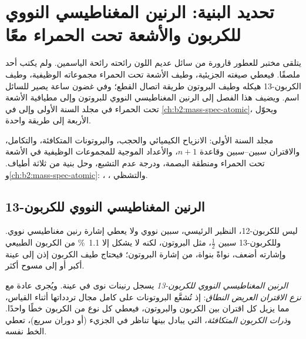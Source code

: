 \chapter{تحديد البنية: الرنين المغناطيسي النووي للكربون \texorpdfstring{\protect{}}{13C}  والأشعة تحت الحمراء معًا}\label{ch:b2:structure-determination}

يتلقى مختبر للعطور قارورة من سائل عديم اللون رائحته رائحة الياسمين. ولم يكتب أحد
ملصقًا. فيعطي  صيغته الجزيئية، وطيف الأشعة تحت الحمراء مجموعاته
الوظيفية، وطيف الكربون-13 هيكله وطيف البروتون طريقة اتصال القطع؛ وفي غضون
ساعة يصير للسائل اسم. ويضيف هذا الفصل  إلى الرنين المغناطيسي النووي للبروتون وإلى مطيافية الأشعة تحت الحمراء
في مجلد السنة الأولى وإلى  في \cref{ch:b2:mass-spec-atomic}، ويحوّل الأربعة
إلى طريقة واحدة.

\begin{recall}
مجلد السنة الأولى: الانزياح الكيميائي والحجب، والبروتونات المتكافئة، والتكامل، والاقتران سبين--سبين
وقاعدة $n + 1$، والأعداد الموجية للمجموعات الوظيفية في الأشعة تحت الحمراء ومنطقة البصمة، ودرجة
عدم التشبع، وحل بنية من ثلاثة أطياف. و\cref{ch:b2:mass-spec-atomic}: ،
، والتشظي.
\end{recall}

\section{الرنين المغناطيسي النووي للكربون-13}

ليس للكربون-12، النظير الرئيسي، سبين نووي ولا يعطي إشارة رنين مغناطيسي نووي. وللكربون-13 سبين
$\tfrac12$، مثل البروتون، لكنه لا يشكل إلا 1.1~\% من الكربون الطبيعي وإشارته أضعف،
نواةً بنواة، من إشارة البروتون؛ فيحتاج طيف الكربون إذن إلى عينة أكبر أو إلى مسوح أكثر.

\begin{definition}\label{def:b2:structure-determination:c13}
\emph{الرنين المغناطيسي النووي للكربون-13} يسجل رنينات نوى  في عينة.
ويُجرى عادة مع \emph{نزع الاقتران العريض النطاق}: إذ تُشعَّع
البروتونات على كامل مجال تردداتها أثناء القياس، مما يزيل كل
اقتران بين الكربون والبروتون، فيعطي كل نوع من الكربون خطًا واحدًا. و\emph{ذرات الكربون
المتكافئة}، التي يبادل بينها تناظر في الجزيء (أو دوران سريع)،
تعطي الخط نفسه.
\end{definition}

